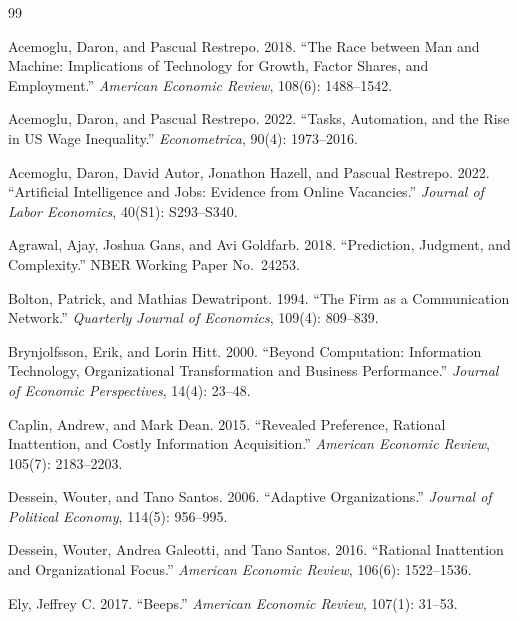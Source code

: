 \begin{thebibliography}{99}

Acemoglu, Daron, and Pascual Restrepo. 2018.
``The Race between Man and Machine: Implications of Technology for Growth, Factor Shares, and Employment.''
\textit{American Economic Review}, 108(6): 1488--1542.

Acemoglu, Daron, and Pascual Restrepo. 2022.
``Tasks, Automation, and the Rise in US Wage Inequality.''
\textit{Econometrica}, 90(4): 1973--2016.

Acemoglu, Daron, David Autor, Jonathon Hazell, and Pascual Restrepo. 2022.
``Artificial Intelligence and Jobs: Evidence from Online Vacancies.''
\textit{Journal of Labor Economics}, 40(S1): S293--S340.

Agrawal, Ajay, Joshua Gans, and Avi Goldfarb. 2018.
``Prediction, Judgment, and Complexity.''
NBER Working Paper No.~24253.

Bolton, Patrick, and Mathias Dewatripont. 1994.
``The Firm as a Communication Network.''
\textit{Quarterly Journal of Economics}, 109(4): 809--839.

Brynjolfsson, Erik, and Lorin Hitt. 2000.
``Beyond Computation: Information Technology, Organizational Transformation and Business Performance.''
\textit{Journal of Economic Perspectives}, 14(4): 23--48.

Caplin, Andrew, and Mark Dean. 2015.
``Revealed Preference, Rational Inattention, and Costly Information Acquisition.''
\textit{American Economic Review}, 105(7): 2183--2203.

Dessein, Wouter, and Tano Santos. 2006.
``Adaptive Organizations.''
\textit{Journal of Political Economy}, 114(5): 956--995.

Dessein, Wouter, Andrea Galeotti, and Tano Santos. 2016.
``Rational Inattention and Organizational Focus.''
\textit{American Economic Review}, 106(6): 1522--1536.

Ely, Jeffrey C. 2017.
``Beeps.''
\textit{American Economic Review}, 107(1): 31--53.


\end{thebibliography}

